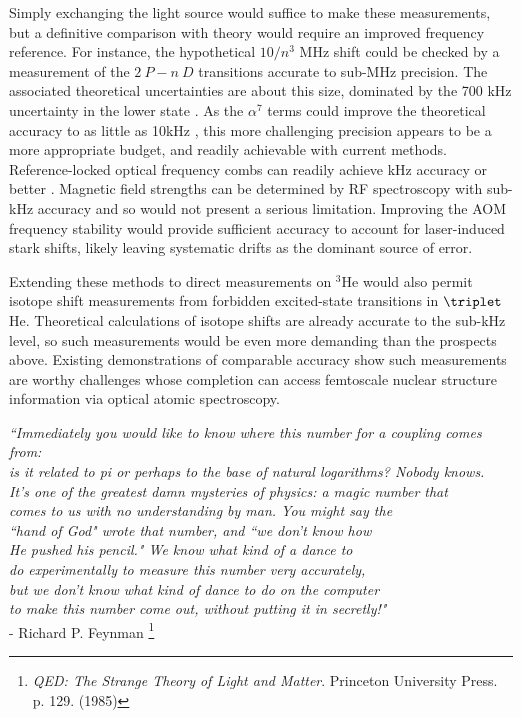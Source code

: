Simply exchanging the light source would suffice to make these measurements, but a definitive comparison with theory would require an improved frequency reference.
	For instance, the hypothetical $10/n^3$ MHz shift could be checked by a measurement of the $2~P-n~D$ transitions accurate to sub-MHz precision.
	The associated theoretical uncertainties are about this size, dominated by the 700 kHz uncertainty in the lower state \cite{Pachucki17,Wienczek19}.
	As the $\alpha^7$ terms could improve the theoretical accuracy to as little as 10kHz \cite{Pachucki17}, this more challenging precision appears to be a more appropriate budget, and readily achievable with current methods.
	Reference-locked optical frequency combs can readily achieve kHz accuracy or better \cite{Luo15,Rengelink18}.
	Magnetic field strengths can be determined by RF spectroscopy with sub-kHz accuracy and so would not present a serious limitation.
	Improving the AOM frequency stability would provide sufficient accuracy to account for laser-induced stark shifts, likely leaving systematic drifts as the dominant source of error.

Extending these methods to direct measurements on $^3$He would also permit isotope shift measurements from forbidden excited-state transitions in $\triplet$He.
	Theoretical calculations of isotope shifts are already accurate to the sub-kHz level, so such measurements would be even more demanding than the prospects above.
	Existing demonstrations of comparable accuracy \cite{Rengelink18} show such measurements are worthy challenges whose completion can access femtoscale nuclear structure information via optical atomic spectroscopy.


\vfill

\begin{flushright}
\emph{
``Immediately you would like to know where this number for a coupling comes from:\\ 
is it related to pi or perhaps to the base of natural logarithms? Nobody knows.\\
It's one of the greatest damn mysteries of physics: a magic number that\\
comes to us with no understanding by man.
	You might say the \\
``hand of God" wrote that number, and ``we don't know how\\
He pushed his pencil." We know what kind of a dance to\\
 do experimentally to measure this number very accurately,\\
  but we don't know what kind of dance to do on the computer\\
to make this number come out, without putting it in secretly!"}\\
- Richard P.
	Feynman \footnote{\emph{QED: The Strange Theory of Light and Matter}.
	Princeton University Press.
	p.
	129.
	(1985)}
\end{flushright}



